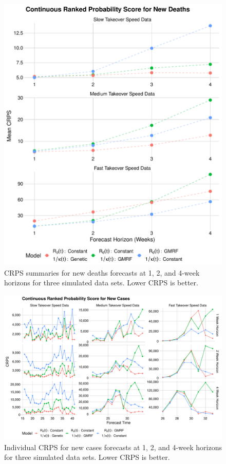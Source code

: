 \begin{figure}
    \centering
    \includegraphics[width=1.0\columnwidth]{simulated_crps_comparison_dotplot_data_new_deaths_plot}
    \caption{CRPS summaries for new deaths forecasts at 1, 2, and 4-week horizons for three simulated data sets. Lower CRPS is better.}
    \label{ch_5:fig:simulated_crps_comparison_dotplot_data_new_deaths_plot}
\end{figure}

\begin{figure}
    \centering
    \includegraphics[width=1.0\columnwidth]{simulated_crps_comparison_data_new_cases_plot}
    \caption{Individual CRPS for new cases forecasts at 1, 2, and 4-week horizons for three simulated data sets. Lower CRPS is better.}
    \label{ch_5:fig:simulated_crps_comparison_data_new_cases_plot}
\end{figure}

